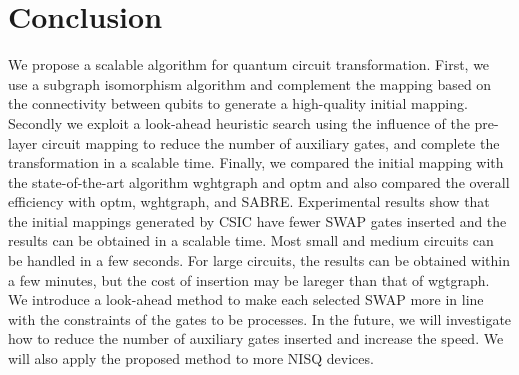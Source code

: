 \documentclass[runningheads]{llncs}
\begin{document}
\section{Conclusion}
\label{Conclusion}
We propose a scalable algorithm for quantum circuit transformation. First, we use a subgraph isomorphism algorithm and complement the mapping based on the connectivity between qubits to generate a high-quality initial mapping. Secondly we exploit a look-ahead heuristic search using the influence of the pre-layer circuit mapping to reduce the number of auxiliary gates, and complete the transformation in a scalable time. Finally, we compared the initial mapping with the state-of-the-art algorithm wghtgraph and optm and also compared the overall efficiency with optm, wghtgraph, and SABRE.
Experimental results show that the initial mappings generated by CSIC have fewer SWAP gates inserted and the results can be obtained in a scalable time. Most small and medium circuits can be handled in a few seconds.
For large circuits, the results can be obtained within a few minutes,
but the cost of insertion may be lareger than that of wgtgraph.
We introduce a look-ahead method to make each selected SWAP more in line with the constraints of the gates to be processes.
In the future, we will investigate how to reduce the number of auxiliary gates inserted and increase the speed. We will also apply the proposed method to more NISQ devices.





\newpage
\appendix
\end{document}
